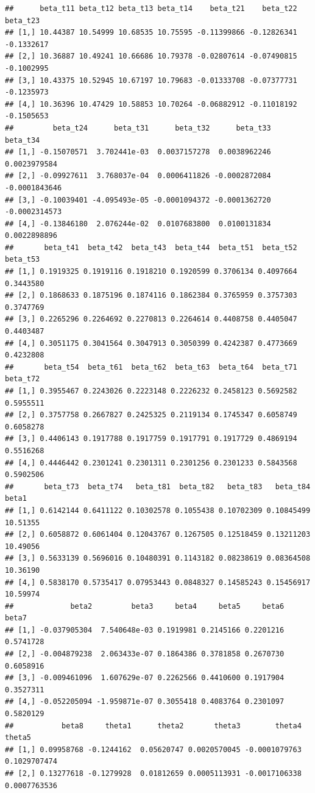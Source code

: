\documentclass[a4paper, preprint, 3p,
authoryear]{elsarticle} %
\begin{document}
\begin{verbatim}
##      beta_t11 beta_t12 beta_t13 beta_t14    beta_t21    beta_t22   beta_t23
## [1,] 10.44387 10.54999 10.68535 10.75595 -0.11399866 -0.12826341 -0.1332617
## [2,] 10.36887 10.49241 10.66686 10.79378 -0.02807614 -0.07490815 -0.1002995
## [3,] 10.43375 10.52945 10.67197 10.79683 -0.01333708 -0.07377731 -0.1235973
## [4,] 10.36396 10.47429 10.58853 10.70264 -0.06882912 -0.11018192 -0.1505653
##         beta_t24      beta_t31      beta_t32      beta_t33      beta_t34
## [1,] -0.15070571  3.702441e-03  0.0037157278  0.0038962246  0.0023979584
## [2,] -0.09927611  3.768037e-04  0.0006411826 -0.0002872084 -0.0001843646
## [3,] -0.10039401 -4.095493e-05 -0.0001094372 -0.0001362720 -0.0002314573
## [4,] -0.13846180  2.076244e-02  0.0107683800  0.0100131834  0.0022898896
##       beta_t41  beta_t42  beta_t43  beta_t44  beta_t51  beta_t52  beta_t53
## [1,] 0.1919325 0.1919116 0.1918210 0.1920599 0.3706134 0.4097664 0.3443580
## [2,] 0.1868633 0.1875196 0.1874116 0.1862384 0.3765959 0.3757303 0.3747769
## [3,] 0.2265296 0.2264692 0.2270813 0.2264614 0.4408758 0.4405047 0.4403487
## [4,] 0.3051175 0.3041564 0.3047913 0.3050399 0.4242387 0.4773669 0.4232808
##       beta_t54  beta_t61  beta_t62  beta_t63  beta_t64  beta_t71  beta_t72
## [1,] 0.3955467 0.2243026 0.2223148 0.2226232 0.2458123 0.5692582 0.5955511
## [2,] 0.3757758 0.2667827 0.2425325 0.2119134 0.1745347 0.6058749 0.6058278
## [3,] 0.4406143 0.1917788 0.1917759 0.1917791 0.1917729 0.4869194 0.5516268
## [4,] 0.4446442 0.2301241 0.2301311 0.2301256 0.2301233 0.5843568 0.5902506
##       beta_t73  beta_t74   beta_t81  beta_t82   beta_t83   beta_t84    beta1
## [1,] 0.6142144 0.6411122 0.10302578 0.1055438 0.10702309 0.10845499 10.51355
## [2,] 0.6058872 0.6061404 0.12043767 0.1267505 0.12518459 0.13211203 10.49056
## [3,] 0.5633139 0.5696016 0.10480391 0.1143182 0.08238619 0.08364508 10.36190
## [4,] 0.5838170 0.5735417 0.07953443 0.0848327 0.14585243 0.15456917 10.59974
##             beta2         beta3     beta4     beta5     beta6     beta7
## [1,] -0.037905304  7.540648e-03 0.1919981 0.2145166 0.2201216 0.5741728
## [2,] -0.004879238  2.063433e-07 0.1864386 0.3781858 0.2670730 0.6058916
## [3,] -0.009461096  1.607629e-07 0.2262566 0.4410600 0.1917904 0.3527311
## [4,] -0.052205094 -1.959871e-07 0.3055418 0.4083764 0.2301097 0.5820129
##           beta8     theta1      theta2       theta3        theta4       theta5
## [1,] 0.09958768 -0.1244162  0.05620747 0.0020570045 -0.0001079763 0.1029707474
## [2,] 0.13277618 -0.1279928  0.01812659 0.0005113931 -0.0017106338 0.0007763536

\end{verbatim}
\end{document}
